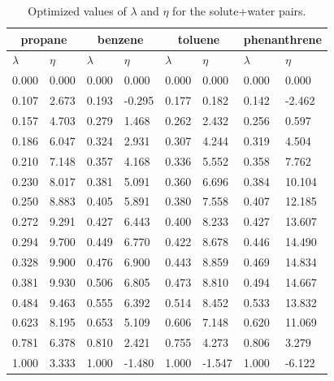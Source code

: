 \begin{table}[h]
	\centering
	\caption{Optimized values of $\lambda $ and $\eta $ for the solute+water pairs. }
	\label{tbl:lambdawater}
	\begin{tabular}{llllllll}
		\hline\hline
		\multicolumn{2}{c}{propane}& \multicolumn{2}{c}{benzene}& \multicolumn{2}{c}{toluene}& \multicolumn{2}{c}{phenanthrene}\\
		\hline\hline
		$\lambda$ & $\eta$ & $\lambda$ & $\eta$  & $\lambda$ & $\eta$  & $\lambda$ & $\eta$ \\ 
		\hline\hline
		0.000	&	0.000	&	0.000	&	0.000	&	0.000	&	0.000	&	0.000	&	0.000	\\
		0.107	&	2.673	&	0.193	&	-0.295	&	0.177	&	0.182	&	0.142	&	-2.462	\\
		0.157	&	4.703	&	0.279	&	1.468	&	0.262	&	2.432	&	0.256	&	0.597	\\
		0.186	&	6.047	&	0.324	&	2.931	&	0.307	&	4.244	&	0.319	&	4.504	\\
		0.210	&	7.148	&	0.357	&	4.168	&	0.336	&	5.552	&	0.358	&	7.762	\\
		0.230	&	8.017	&	0.381	&	5.091	&	0.360	&	6.696	&	0.384	&	10.104	\\
		0.250	&	8.883	&	0.405	&	5.891	&	0.380	&	7.558	&	0.407	&	12.185	\\
		0.272	&	9.291	&	0.427	&	6.443	&	0.400	&	8.233	&	0.427	&	13.607	\\
		0.294	&	9.700	&	0.449	&	6.770	&	0.422	&	8.678	&	0.446	&	14.490	\\
		0.328	&	9.900	&	0.476	&	6.900	&	0.443	&	8.859	&	0.469	&	14.834	\\
		0.381	&	9.930	&	0.506	&	6.805	&	0.473	&	8.810	&	0.494	&	14.667	\\
		0.484	&	9.463	&	0.555	&	6.392	&	0.514	&	8.452	&	0.533	&	13.832	\\
		0.623	&	8.195	&	0.653	&	5.109	&	0.606	&	7.148	&	0.620	&	11.069	\\
		0.781	&	6.378	&	0.810	&	2.421	&	0.755	&	4.273	&	0.806	&	3.279	\\
		1.000	&	3.333	&	1.000	&	-1.480	&	1.000	&	-1.547	&	1.000	&	-6.122	\\		
		\hline\hline
	\end{tabular}
\end{table}


